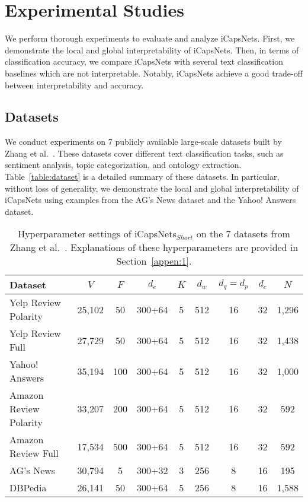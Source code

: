 \documentclass[10pt,journal,compsoc]{IEEEtran}
\begin{document}
\section{Experimental Studies}

We perform thorough experiments to evaluate and analyze iCapsNets. First, we demonstrate the local and global interpretability of iCapsNets. Then, in terms of classification accuracy, we compare iCapsNets with several text classification baselines which are not interpretable. Notably, iCapsNets achieve a good trade-off between interpretability and accuracy.

\subsection{Datasets}

We conduct experiments on 7 publicly available large-scale datasets built by Zhang et al.~\cite{zhang2015character}. These datasets cover different text classification tasks, such as sentiment analysis, topic categorization, and ontology extraction. Table~\ref{table:dataset} is a detailed summary of these datasets. In particular, without loss of generality, we demonstrate the local and global interpretability of iCapsNets using examples from the AG's News dataset and the Yahoo! Answers dataset.


\begin{table*}[!t]
	\caption{Hyperparameter settings of iCapsNets$_{Short}$ on the 7 datasets from Zhang et al.~\cite{zhang2015character}. Explanations of these hyperparameters are provided in Section~\ref{appen:1}.}
	\begin{center}
		\begin{tabular}{l|cccccccc}
			Dataset & $V$ & $F$ & $d_e$ & $K$ & $d_w$ & $d_q=d_p$ & $d_c$ & $N$ \\
			\hline
			Yelp Review Polarity & 25,102 & 50 & 300+64 & 5 & 512 & 16 & 32 & 1,296 \\
			Yelp Review Full & 27,729 & 50 & 300+64 & 5 & 512 & 16 & 32 & 1,438 \\
			Yahoo! Answers & 35,194 & 100 & 300+64 & 5 & 512 & 16 & 32 & 1,000 \\
			Amazon Review Polarity & 33,207 & 200 & 300+64 & 5 & 512 & 16 & 32 & 592 \\
			Amazon Review Full & 17,534 & 500 & 300+64 & 5 & 512 & 16 & 32 & 592 \\
			AG's News & 30,794 & 5 & 300+32 & 3 & 256 & 8 & 16 & 195 \\
			DBPedia & 26,141 & 50 & 300+64 & 5 & 256 & 8 & 16 & 1,588
		\end{tabular}
		\label{table:short_setup}
	\end{center}
\end{table*}
\end{document}
